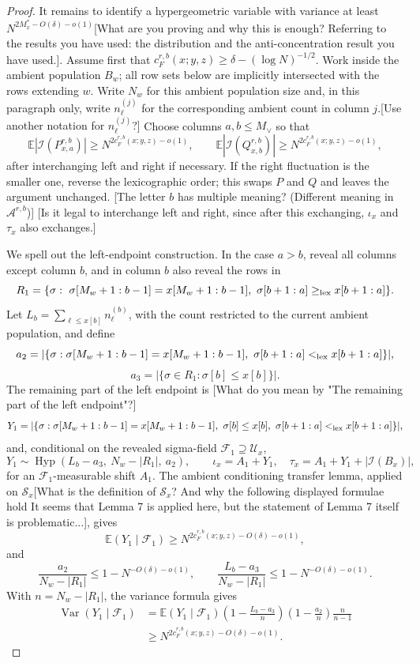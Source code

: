 \documentclass[11pt]{article}
\newcommand{\cI}{\mathcal I}
\newcommand{\E}{\mathbb E}
\newcommand{\jscomment}[1]{\textup{\textsf{\color{blue}[#1]}}}
\begin{document}
\begin{proof}
It remains to identify a hypergeometric variable with variance at least
\(N^{2M_x^*-O(\delta)-o(1)}\)\jscomment{What are you proving and why this is enough? Referring to the results you have used: the distribution and the anti-concentration result you have used.}. Assume first that
\(c_F^{r,b}(x;y,z)\ge\delta-(\log N)^{-1/2}\). Work inside the ambient
population \(B_w\); all row sets below are implicitly intersected with
the rows extending \(w\). Write \(N_w\) for this ambient population size
and, in this paragraph only, write \(n_\ell^{(j)}\) for the corresponding
ambient count in column \(j\).\jscomment{Use another notation for \(n_\ell^{(j)}\)?} Choose columns \(a,b\le M_\vee\) so that
\[
    \E|\cI(P_{x,a}^{r,b})|
    \ge
    N^{2c_F^{r,b}(x;y,z)-o(1)},\qquad
    \E|\cI(Q_{x,b}^{r,b})|
    \ge
    N^{2c_F^{r,b}(x;y,z)-o(1)},
\]
after interchanging left and right if necessary. If the right fluctuation
is the smaller one, reverse the lexicographic order; this swaps \(P\) and
\(Q\) and leaves the argument unchanged.
\jscomment{The letter $b$ has multiple meaning? (Different meaning in $\mathcal A^{r,b}$)}
\jscomment{Is it legal to interchange left and right, since after this exchanging, $\iota_x$ and $\tau_x$ also exchanges.}

We spell out the left-endpoint construction. In the case \(a>b\), reveal
all columns except column \(b\), and in column \(b\) also reveal the rows
in
\[
    R_1=\{\sigma:\ \sigma[M_w+1:b-1]=x[M_w+1:b-1],\
    \sigma[b+1:a]\ge_{\rm lex} x[b+1:a]\}.
\]
Let \(L_b=\sum_{\ell\le x[b]}n_\ell^{(b)}\), with the count restricted to
the current ambient population, and define
\[
    a_2=|\{\sigma:\sigma[M_w+1:b-1]=x[M_w+1:b-1],\
           \sigma[b+1:a]<_{\rm lex}x[b+1:a]\}|,
\]
\[
    a_3=|\{\sigma\in R_1:\sigma[b]\le x[b]\}|.
\]
The remaining part of the left endpoint is \jscomment{What do you mean by "The remaining part of the left endpoint"?}
\[
    Y_1=
    |\{\sigma:\sigma[M_w+1:b-1]=x[M_w+1:b-1],\
       \sigma[b]\le x[b],\ \sigma[b+1:a]<_{\rm lex}x[b+1:a]\}|,
\]
and, conditional on the revealed sigma-field \(\mathcal F_1\supseteq
\mathcal U_x\),
\[
    Y_1\sim\operatorname{Hyp}(L_b-a_3,\ N_w-|R_1|,\ a_2),
    \qquad
    \iota_x=A_1+Y_1,\quad
    \tau_x=A_1+Y_1+|\cI(B_x)|,
\]
for an \(\mathcal F_1\)-measurable shift \(A_1\). The ambient conditioning
transfer lemma, applied on \(\mathcal S_x\)\jscomment{What is the definition of $\mathcal S_x$? And why the following displayed formulae hold It seems that Lemma 7 is applied here, but the statement of Lemma 7 itself is problematic...}, gives
\[
    \E(Y_1\mid\mathcal F_1)\ge N^{2c_F^{r,b}(x;y,z)-O(\delta)-o(1)},
\]
and
\[
    \frac{a_2}{N_w-|R_1|}\le 1-N^{-O(\delta)-o(1)},\qquad
    \frac{L_b-a_3}{N_w-|R_1|}\le 1-N^{-O(\delta)-o(1)}.
\]
With \(n=N_w-|R_1|\), the variance formula gives
\[
\begin{aligned}
    \operatorname{Var}(Y_1\mid\mathcal F_1)
    &=
    \E(Y_1\mid\mathcal F_1)
    \left(1-\frac{L_b-a_3}{n}\right)
    \left(1-\frac{a_2}{n}\right)
    \frac{n}{n-1}\\
    &\ge N^{2c_F^{r,b}(x;y,z)-O(\delta)-o(1)}.
\end{aligned}
\]


\end{proof}
\end{document}
